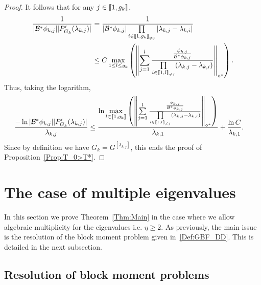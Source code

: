 \documentclass[AHL,Unicode,longabstracts]{cedram}
\newcommand{\llbracket}{\mathopen{[\mkern -2.7mu[}}
\newcommand{\rrbracket}{\mathclose{]\mkern -2.7mu]}}
\newcommand{\inter}[2]{\llbracket #1,#2 \rrbracket}
\newcommand{\interexclu}[3]{\llbracket #1,#2\rrbracket_{\neq #3}}
\newcommand\Bs{\mathcal{B}^*}
\newcommand{\normeXalphas}[1]{\left\| #1 \right\|_{\diamond^*}}
\newcommand{\n}{g}
\begin{document}
\begin{proof}
It follows that for any $j \in \inter{1}{\n_k}$,
\begin{align*}
\frac{1}{ | \Bs\phi_{k,j} | | P_{G_k}'(\lambda_{k,j}) | } &= \frac{1}{ | \Bs \phi_{k,j} | \prod\limits_{i\in \interexclu{1}{\n_k}{j}}|\lambda_{k,j}-\lambda_{k,i} | }
\\
&\leq C \max\limits_{1 \leq l \leq \n_k} \left(\normeXalphas{ \sum\limits_{j=1}^{l} \frac{ \frac{\phi_{k,j}}{\Bs \phi_{k,j}}}{\prod\limits_{i\in \interexclu{1}{l}{j} } (\lambda_{k,j}-\lambda_{k,i})} } \right).
\end{align*}
Thus, taking the logarithm,
\begin{align*}
\frac{-\ln | \Bs \phi_{k,j} | | P_{G_k}'(\lambda_{k,j}) |}{\lambda_{k,j}} &\leq \frac{\ln \max\limits_{l\in \inter{1}{\n_k} } \left(\normeXalphas{ \sum\limits_{j=1}^{l} \frac{ \frac{\phi_{k,j}}{\Bs \phi_{k,j}}}{\prod\limits_{i\in \interexclu{1}{l}{j}} (\lambda_{k,j}-\lambda_{k,i})} } \right)}{\lambda_{k,1}} + \frac{\ln C}{\lambda_{k,1}}.
\end{align*}
Since by definition we have $G_k=G^{[\lambda_{k,j}]}$, this ends the proof of Proposition~\ref{Prop:T_0>T*}.
\end{proof}



\section{The case of multiple eigenvalues}\label{Sec:ValPropresMultiples}

In this section we prove Theorem~\ref{Thm:Main} in the case where we allow algebraic multiplicity for the eigenvalues i.e. $\eta \geq 2$. As previously, the main issue is the resolution of the block moment problem given in~\eqref{Def:GBF_DD}. This is detailed in the next subsection.



\subsection{Resolution of block moment problems}
\end{document}
